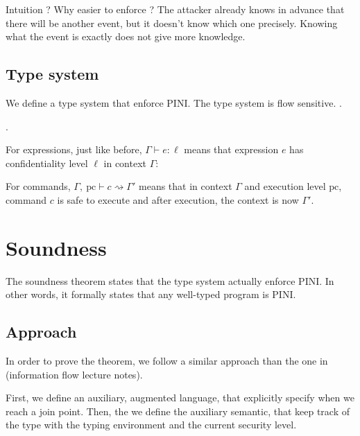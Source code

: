 \documentclass[10pt]{article}
\newcommand{\pc}{\mathrm{pc}}
\newcommand{\ctx}{\Gamma}
\newcommand{\typing}[4]{ #1,~#2 \vdash #3 \rightsquigarrow #4}
\newcommand{\etyping}[3]{ #1 \vdash #2 : #3}
\begin{document}
Intuition ? Why easier to enforce ?
The attacker already knows in advance that there will be another event, but it doesn't know which
one precisely. Knowing what the event is exactly does not give more knowledge.

\subsection{Type system}%
\label{subsec:type_system}

We define a type system that enforce PINI.
The type system is flow sensitive.
.

.

For expressions, just like before, \( \etyping{\ctx}{e}{\ell} \) means that expression \( e \) has
confidentiality level \( \ell \) in context \( \ctx \):



For commands, \( \typing{\ctx}{\pc}{c}{\ctx'} \) means that in context \( \ctx \) and execution
level \( \pc \), command \( c \) is safe to execute and after execution, the context is now
\( \ctx' \).




\section{Soundness}%
\label{sec:soundness}

The soundness theorem states that the type system actually enforce PINI. In other words, it formally
states that any well-typed program is PINI.


\subsection{Approach}%
\label{subsec:approach}

In order to prove the theorem, we follow a similar approach than the one in (information flow
lecture notes).

First, we define an auxiliary, augmented language, that explicitly specify when we reach a join
point. Then, the we define the auxiliary semantic, that keep track of the type with the typing
environment and the current security level.
\end{document}
